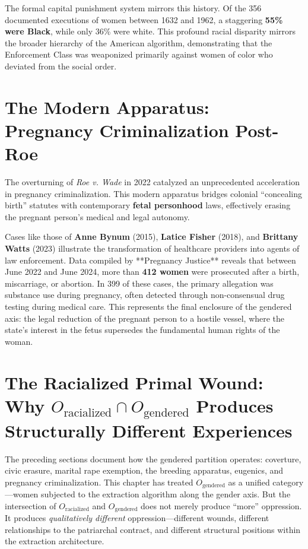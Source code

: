 \documentclass[12pt,openany]{book}
\begin{document}
The formal capital punishment system mirrors this history. Of the 356 documented executions of women between 1632 and 1962, a staggering \textbf{55\% were Black}, while only 36\% were white. This profound racial disparity mirrors the broader hierarchy of the American algorithm, demonstrating that the Enforcement Class was weaponized primarily against women of color who deviated from the social order.

\section{The Modern Apparatus: Pregnancy Criminalization Post-Roe}

The overturning of \textit{Roe v. Wade} in 2022 catalyzed an unprecedented acceleration in pregnancy criminalization. This modern apparatus bridges colonial ``concealing birth'' statutes with contemporary \textbf{fetal personhood} laws, effectively erasing the pregnant person's medical and legal autonomy. 

Cases like those of \textbf{Anne Bynum} (2015), \textbf{Latice Fisher} (2018), and \textbf{Brittany Watts} (2023) illustrate the transformation of healthcare providers into agents of law enforcement. Data compiled by **Pregnancy Justice** reveals that between June 2022 and June 2024, more than \textbf{412 women} were prosecuted after a birth, miscarriage, or abortion. In 399 of these cases, the primary allegation was substance use during pregnancy, often detected through non-consensual drug testing during medical care. This represents the final enclosure of the gendered axis: the legal reduction of the pregnant person to a hostile vessel, where the state's interest in the fetus supersedes the fundamental human rights of the woman.

\section{The Racialized Primal Wound: Why $O_{\text{racialized}} \cap O_{\text{gendered}}$ Produces Structurally Different Experiences}

The preceding sections document how the gendered partition operates: coverture, civic erasure, marital rape exemption, the breeding apparatus, eugenics, and pregnancy criminalization. This chapter has treated $O_{\text{gendered}}$ as a unified category---women subjected to the extraction algorithm along the gender axis. But the intersection of $O_{\text{racialized}}$ and $O_{\text{gendered}}$ does not merely produce ``more'' oppression. It produces \textit{qualitatively different} oppression---different wounds, different relationships to the patriarchal contract, and different structural positions within the extraction architecture.
\end{document}
